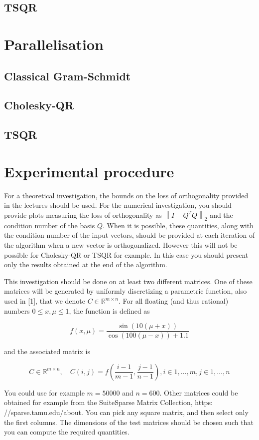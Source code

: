 \documentclass[a4paper, 12pt,oneside]{article}
\begin{document}
		\subsection{TSQR}
	\section{Parallelisation}
		\subsection{Classical Gram-Schmidt}
		\subsection{Cholesky-QR}
		\subsection{TSQR}
	
	\section{Experimental procedure}
		For a theoretical investigation, the bounds on the loss of orthogonality provided in the lectures should be used. For the numerical investigation, you should provide plots measuring the loss of orthogonality as $\left\|I-Q^T Q\right\|_2$ and the condition number of the basis $Q$. When it is possible, these quantities, along with the condition number of the input vectors, should be provided at each iteration of the algorithm when a new vector is orthogonalized. However this will not be possible for Cholesky-QR or TSQR for example. In this case you should present only the results obtained at the end of the algorithm.

		This investigation should be done on at least two different matrices. One of these matrices will be generated by uniformly discretizing a parametric function, also used in [1], that we denote $C \in \mathbb{R}^{m \times n}$. For all floating (and thus rational) numbers $0 \leq x, \mu \leq 1$, the function is defined as
		
		$$
		f(x, \mu)=\frac{\sin (10(\mu+x))}{\cos (100(\mu-x))+1.1}
		$$
		
		and the associated matrix is
		
		$$
		C \in \mathbb{R}^{m \times n}, \quad C(i, j)=f\left(\frac{i-1}{m-1}, \frac{j-1}{n-1}\right), i \in 1, \ldots, m, j \in 1, \ldots, n
		$$
		
		
		You could use for example $m=50000$ and $n=600$.
		Other matrices could be obtained for example from the SuiteSparse Matrix Collection, https: //sparse.tamu.edu/about. You can pick any square matrix, and then select only the first columns. The dimensions of the test matrices should be chosen such that you can compute the required quantities.
		
\end{document}
